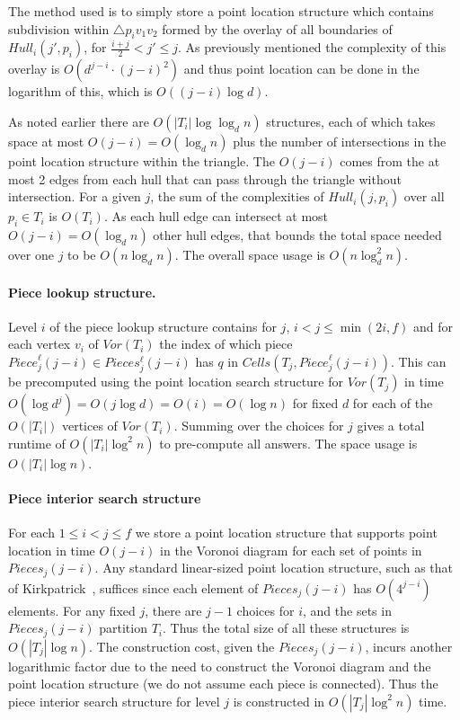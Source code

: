 \documentclass[12pt,a4paper,USenglish,cleveref, autoref, thm-restate]{article}
\newcommand{\Cells}{\mathit{Cells}}
\newcommand{\Piece}{\mathit{Piece}}
\newcommand{\Pieces}{\mathit{Pieces}}
\newcommand{\Hull}{\mathit{Hull}}
\newcommand{\Voron}{\mathit{Vor}}
\newcommand{\Cells}{\mathit{Cells}}
\newcommand{\Piece}{\mathit{Piece}}
\newcommand{\Pieces}{\mathit{Pieces}}
\newcommand{\Hull}{\mathit{Hull}}
\newcommand{\Voron}{\mathit{Vor}}
\newcommand{\Cells}{\mathit{Cells}}
\newcommand{\Piece}{\mathit{Piece}}
\newcommand{\Pieces}{\mathit{Pieces}}
\newcommand{\Hull}{\mathit{Hull}}
\newcommand{\Voron}{\mathit{Vor}}
\begin{document}
The method used is to simply store a point location structure which contains subdivision within $\triangle p_iv_1v_2$ formed by the overlay of all boundaries of $\Hull_i(j',p_i)$, for $\frac{i+j}{2}< j'\leq j$. As previously mentioned the complexity of this overlay is $O(d^{j-i}\cdot(j-i)^{2})$ and thus point location can be done in the logarithm of this, which is $O((j-i)\log d)$.

 As noted earlier there are $O(|T_i| \log \log_d n)$ structures, each of which takes space at most $O(j-i)=O(\log_d n)$ plus the number of intersections in the point location structure within the triangle. The $O(j-i)$ comes from the at most 2 edges from each hull that can pass through the triangle without intersection.  For a given $j$, the sum of the complexities of $\Hull_i(j,p_i)$ over all $p_i \in T_i$ is $O(T_i)$. As each hull edge can intersect at most $O(j-i)= O(\log_d n)$ other hull edges, that bounds the total space needed over one $j$ to be $O(n \log_d n)$. The overall space usage is $O(n\log_d^2 n)$.


\paragraph*{Piece lookup structure.}
Level $i$ of the piece lookup structure contains for $j$, $i<j\leq \min(2i,f)$ and for each vertex $v_i$ of $\Voron(T_i)$ the index of which piece $\Piece^\ell_j(j-i) \in Pieces^\ell_j(j-i)$ has $q$ in $\Cells(T_j,\Piece^\ell_j(j-i))$. This can be precomputed using the point location search structure for $\Voron(T_j)$ in time $O(\log d^j)=O(j \log d)=O(i)=O(\log n)$ for fixed $d$ for each of the $O(|T_i|)$ vertices of  $\Voron(T_i)$. Summing over the choices for $j$ gives a total runtime of  $O(|T_i|\log^2 n)$ to pre-compute all answers. The space usage is $O(|T_i|\log n)$.


\paragraph*{Piece interior search structure} For each $1\leq i < j \leq f$ we store a point location structure that supports point location in time $O(j-i)$ in the Voronoi diagram for each set of points in $\Pieces_j(j-i)$. Any standard linear-sized point location structure, such as that of Kirkpatrick~\cite{Kirkpatrick83}, suffices since each element of $\Pieces_j(j-i)$ has $O(4^{j-i})$ elements. For any fixed $j$, there are $j-1$ choices for $i$, and the sets in $\Pieces_j(j-i)$ partition $T_i$. Thus the total size of all these structures is $O(|T_j| \log n)$. The construction cost, given the $\Pieces_j(j-i)$, incurs another logarithmic factor due to the need to construct the Voronoi diagram and the point location structure (we do not assume each piece is connected). Thus the piece  interior search structure for level $j$ is constructed in $O(|T_j|\log^2 n)$ time. 
\end{document}

